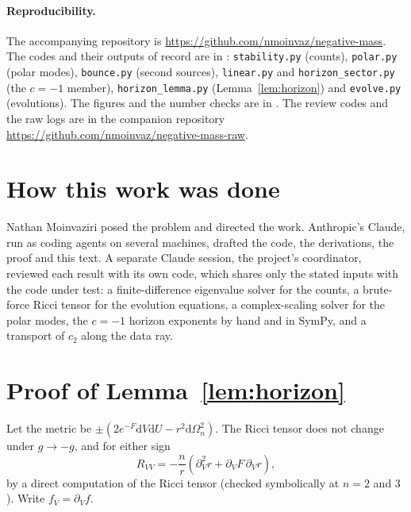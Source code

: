 \documentclass[11pt]{article}
\theoremstyle{plain}
\newcommand{\dd}{\mathrm{d}}
\begin{document}
\paragraph{Reproducibility.} The accompanying repository is \url{https://github.com/nmoinvaz/negative-mass}. The codes and
their outputs of record are in : \texttt{stability.py} (counts), \texttt{polar.py} (polar modes),
\texttt{bounce.py} (second sources), \texttt{linear.py} and \texttt{horizon\_sector.py} (the $c=-1$ member),
\texttt{horizon\_lemma.py} (Lemma~\ref{lem:horizon}) and \texttt{evolve.py} (evolutions). The figures and the number checks
are in . The review codes and the raw logs are in the companion repository
\url{https://github.com/nmoinvaz/negative-mass-raw}.

\section{How this work was done}\label{sec:method}

Nathan Moinvaziri posed the problem and directed the work. Anthropic's Claude, run as coding agents on several machines,
drafted the code, the derivations, the proof and this text. A separate Claude session, the project's coordinator, reviewed each
result with its own code, which shares only the stated inputs with the code under test: a finite-difference eigenvalue solver
for the counts, a brute-force Ricci tensor for the evolution equations, a complex-scaling solver for the polar modes, the
$c=-1$ horizon exponents by hand and in SymPy, and a transport of $c_2$ along the data ray.

\clearpage
\appendix

\section{Proof of Lemma~\ref{lem:horizon}}\label{app:proof}

Let the metric be $\pm(2e^{-F}\dd V\dd U-r^2\dd\Omega_n^2)$. The Ricci tensor does not change under $g\to-g$, and for either
sign
\begin{equation}
R_{VV}=-\frac nr\left(\partial_V^2r+\partial_VF\,\partial_Vr\right),\label{eq:rvv}
\end{equation}
by a direct computation of the Ricci tensor (checked symbolically at $n=2$ and $3$). Write $f_V=\partial_Vf$.
\end{document}
